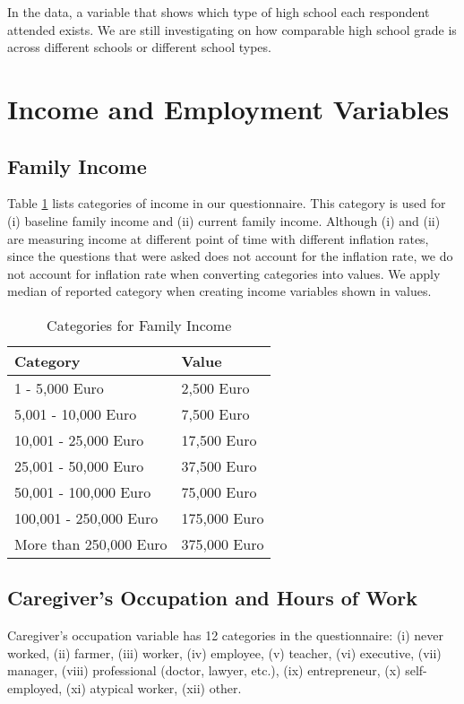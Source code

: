 In the data, a variable that shows which type of high school each respondent attended exists. We are still investigating on how comparable high school grade is across different schools or different school types. 


\section{Income and Employment Variables}
\label{sec:income}
\subsection{Family Income}

Table \ref{tab:faminc} lists categories of income in our questionnaire. This category is used for (i) baseline family income and (ii) current family income. Although (i) and (ii) are measuring income at different point of time with different inflation rates, since the questions that were asked does not account for the inflation rate, we do not account for inflation rate when converting categories into values. We apply median of reported category when creating income variables shown in values. 

\begin{table}[H]
\caption{Categories for Family Income} \label{tab:faminc}
\begin{center}
\begin{tabular}{ll}
\toprule
\textbf{Category} & \textbf{Value} \\ \midrule
	1 - 5,000 Euro					 & 2,500 Euro \\
	5,001 - 10,000 Euro				 & 7,500 Euro \\
	10,001 - 25,000 Euro			 & 17,500 Euro \\
	25,001 - 50,000 Euro			 & 37,500 Euro \\
	50,001 - 100,000 Euro			 & 75,000 Euro \\
	100,001 - 250,000 Euro			 & 175,000 Euro \\
	More than 250,000 Euro			 & 375,000 Euro \\ \bottomrule
\end{tabular}
\end{center}
\end{table}
	
\subsection{Caregiver's Occupation and Hours of Work}
Caregiver's occupation variable has 12 categories in the questionnaire: (i) never worked, (ii) farmer, (iii) worker, (iv) employee, (v) teacher, (vi) executive, (vii) manager, (viii) professional (doctor, lawyer, etc.), (ix) entrepreneur, (x) self-employed, (xi) atypical worker, (xii) other.  

